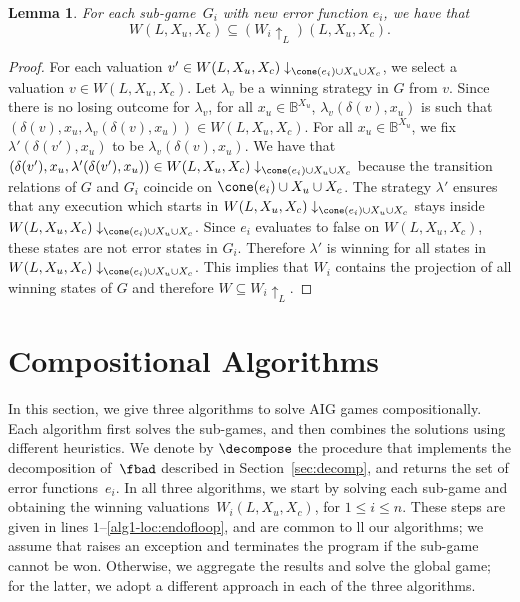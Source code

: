 \documentclass[submission,copyright,creativecommons]{eptcs}
\newtheorem{lemma}{Lemma}
\begin{document}
\begin{lemma}\label{lem:nec-allsub}
  For each sub-game~$G_i$ with new error function $e_i$, we have that
  \[ W(L,X_u,X_c) \subseteq (W_i \uparrow_L)(L,X_u,X_c).\]
\end{lemma}
\begin{proof}
  For each valuation $v' \in W(L,X_u,X_c)\downarrow_{\cone(e_i) \cup X_u \cup
  X_c}$, we select a valuation $v \in W(L,X_u,X_c)$.  Let $\lambda_v$ be a
  winning strategy in $G$ from $v$.  Since there is no losing
  outcome for $\lambda_v$, for all $x_u \in \mathbb{B}^{X_u}$,
  $\lambda_v(\delta(v),x_u)$ is such that
  $(\delta(v),x_u,\lambda_v(\delta(v),x_u)) \in W(L,X_u,X_c)$.  For all $x_u \in
  \mathbb{B}^{X_u}$, we fix $\lambda'(\delta(v'),x_u)$ to be
  $\lambda_v(\delta(v),x_u)$.  We have that
  $(\delta(v'),x_u,\lambda'(\delta(v'),x_u)) \in W(L,X_u,X_c)
  \downarrow_{\cone(e_i) \cup X_u \cup X_c}$ because the transition relations of
  $G$ and $G_i$ coincide on $\cone(e_i) \cup X_u \cup X_c$.  The strategy
  $\lambda'$ ensures that any execution which starts in
  $W(L,X_u,X_c)\downarrow_{\cone(e_i) \cup X_u \cup X_c}$ stays inside
  $W(L,X_u,X_c)\downarrow_{\cone(e_i) \cup X_u \cup X_c}$.  Since $e_i$
  evaluates to false on $W(L,X_u,X_c)$, these states are not error states in
  $G_i$. Therefore $\lambda'$ is winning for all states in
  $W(L,X_u,X_c)\downarrow_{\cone(e_i) \cup X_u \cup X_c}$.  This implies that
  $W_i$ contains the projection of all winning states of $G$ and therefore $W
  \subseteq W_i\uparrow_L $.
\end{proof}


\section{Compositional Algorithms}\label{sec:algos}
In this section, we give three algorithms to solve AIG games compositionally.
Each algorithm first solves the sub-games, and then combines
the solutions using different heuristics.  We denote by
$\decompose$ the procedure that implements the decomposition of~$\fbad$
described in Section~\ref{sec:decomp}, and returns the set of error
functions~$e_i$.
In all three algorithms, we start by solving each sub-game and obtaining the
winning valuations~$W_i(L, X_u, X_c)$, for $1 \le i \le n$.
These steps are given in lines $1$--\ref{alg1-loc:endofloop}, and are common to
ll our algorithms; we assume that \solve{} raises an exception and terminates the
program if the sub-game cannot be won. Otherwise, we aggregate the results and
solve the global game; for the latter, we adopt a different approach in each of
the three algorithms.
\end{document}
